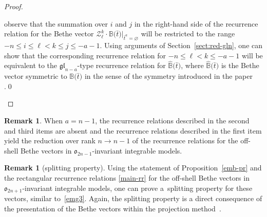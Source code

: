 \documentclass[pdftex]{sigma}
\newcommand{\bt}{{\bar t}}
\theoremstyle{definition}
\newtheorem{rem}[thm]{Remark}
\def\BB{{\mathbb{B}}}
\def\hBB{\hat{\mathbb{B}}}
\def\r#1{\eqref{#1}}
\def\Z{\mathcal{Z}}
\begin{document}
\begin{proof}
\begin{itemize}
observe that the summation over $i$ and $j$ in the right-hand side of the recurrence relation
for the Bethe vector $\Z^k_\ell\cdot
\BB\bigl(\bt\bigr)|_{\bt^a=\varnothing}$ will be restricted to the range
$-n\leq i\leq \ell<k\leq j\leq -a-1$. Using arguments of Section~\ref{sect:red-gln},
one can show that the corresponding
recurrence relation for $-n\leq \ell< k\leq -a-1$ will be equivalent to
the $\mathfrak{gl}_{n-a}$-type recurrence relation for
$\hBB\bigl(\bt\bigr)$, where $\hat\BB\bigl(\bt\bigr)$ is the Bethe vector symmetric
to $\BB\bigl(\bt\bigr)$
in the sense of the symmetry introduced in the paper \cite{LPRS-New}.\hfill \qed
\end{itemize}\renewcommand{\qed}{}
\end{proof}
\begin{rem}
When $a=n-1$, the recurrence relations described in the second and third
items are absent and the recurrence relations described in the first item
yield the reduction over rank $n\to n-1$ of the recurrence relations for the
off-shell Bethe vectors in $\mathfrak{o}_{2n-1}$-invariant integrable models.
\end{rem}

\begin{rem}[splitting property]
Using the statement of Proposition~\ref{emb-pr} and
the rectangular recurrence relations \r{main-rr} for the
off-shell Bethe vectors in $\mathfrak{o}_{2n+1}$-invariant
integrable models, one can prove a~splitting
property for these vectors, similar to~\r{emg3}. Again, the splitting property
is a direct consequence of the presentation of the Bethe vectors within
the projection method~\cite{LP2}.
\end{rem}
\end{document}
